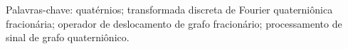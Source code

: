 
%

\lipsum[5]
\vspace{1em}

Palavras-chave: quatérnios; transformada discreta de Fourier quaterniônica fracionária; operador de deslocamento de grafo fracionário; processamento de sinal de grafo quaterniônico.